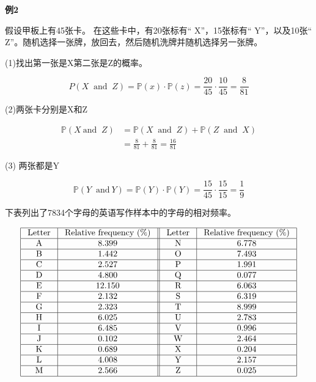 \documentclass{article}
\begin{document}
\textbf{例2}

假设甲板上有45张卡。 在这些卡中，有20张标有“ X”，15张标有“ Y”，以及10张“ Z”。随机选择一张牌，放回去，然后随机洗牌并随机选择另一张牌。 

(1)找出第一张是X第二张是Z的概率。

$$
P(X \ \text { and } \ Z)=\mathbb{P}(x) \cdot \mathbb{P}(z)=\frac{20}{45} \cdot \frac{10}{45}=\frac{8}{81}
$$

(2)两张卡分别是X和Z

$$
\begin{aligned}
\mathbb{P}\left(X \ \text {and } \ Z\right) &=\mathbb{P}(X \ \text { and } \ Z)+\mathbb{P}(Z \ \text { and } \ X) \\
&=\frac{8}{81}+\frac{8}{81}=\frac{16}{81}
\end{aligned}
$$

(3) 两张都是Y

$$
\mathbb{P}(Y \ \text { and} \ Y)=\mathbb{P}(Y) \cdot \mathbb{P}(Y)=\frac{15}{45} \cdot \frac{15}{15}=\frac{1}{9}
$$ \quad\quad\quad\quad\quad\quad\quad\quad\quad\quad\quad\quad\quad\quad\quad\quad\quad\quad\quad\quad\quad\quad\quad\quad\quad\quad\quad\quad\quad\quad\quad\quad\quad\quad\quad\quad\quad\quad\quad\quad\quad\quad   \Box


下表列出了7834个字母的英语写作样本中的字母的相对频率。

$$
\begin{array}{|c|c||c|c|}
\hline \text { Letter } & \text { Relative  frequency (\%) } & \text { Letter } & \text { Relative  frequency (\%) } \\
\hline \text { A } & 8.399 & \text { N } & 6.778 \\
\hline \text { B } & 1.442 & \text { O } & 7.493 \\
\hline \text { C } & 2.527 & \text { P } & 1.991 \\
\hline \text { D } & 4.800 & \text { Q } & 0.077 \\
\hline \text { E } & 12.150 & \text { R } & 6.063 \\
\hline \text { F } & 2.132 & \text { S } & 6.319 \\
\hline \text { G } & 2.323 & \text { T } & 8.999 \\
\hline \text { H } & 6.025 & \text { U } & 2.783 \\
\hline \text { I } & 6.485 & \text { V } & 0.996 \\
\hline \text { J } & 0.102 & \text { W } & 2.464 \\
\hline \text { K } & 0.689 & \text { X } & 0.204 \\
\hline \text { L } & 4.008 & \text { Y } & 2.157 \\
\hline \text { M } & 2.566 & \text { Z } & 0.025 \\
\hline
\end{array}
$$
\end{document}
